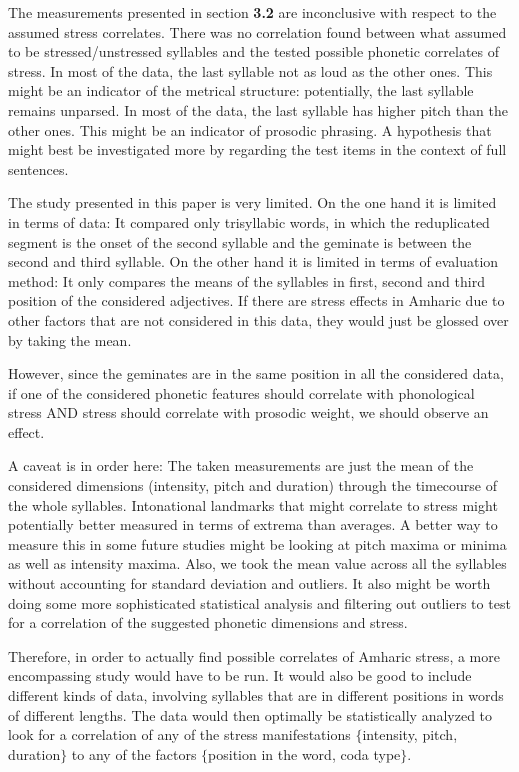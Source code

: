 \documentclass[12pt]{scrartcl}
\begin{document}
The measurements presented in section \textbf{3.2} are inconclusive with respect to the assumed stress correlates. There was no correlation found between what \cite{sande2017} assumed to be stressed/unstressed syllables and the tested possible phonetic correlates of stress. In most of the data, the last syllable not as loud as the other ones. This might be an indicator of the metrical structure: potentially, the last syllable remains unparsed. In most of the data, the last syllable has higher pitch than the other ones. This might be an indicator of prosodic phrasing. A hypothesis that might best be investigated more by regarding the test items in the context of full sentences.

The study presented in this paper is very limited. On the one hand it is limited in terms of data: It compared only trisyllabic words, in which the reduplicated segment is the onset of the second syllable and the geminate is between the second and third syllable. On the other hand it is limited in terms of evaluation method: It only compares the means of the syllables in first, second and third position of the considered adjectives. If there are stress effects in Amharic due to other factors that are not considered in this data, they would just be glossed over by taking the mean.

However, since the geminates are in the same position in all the considered data, if one of the considered phonetic features should correlate with phonological stress AND stress should correlate with prosodic weight, we should observe an effect.

A caveat is in order here: The taken measurements are just the mean of the considered dimensions (intensity, pitch and duration) through the timecourse of the whole syllables. Intonational landmarks that might correlate to stress might potentially better measured in terms of extrema than averages. A better way to measure this in some future studies might be looking at pitch maxima or minima as well as intensity maxima. Also, we took the mean value across all the syllables without accounting for standard deviation and outliers. It also might be worth doing some more sophisticated statistical analysis and filtering out outliers to test for a correlation of the suggested phonetic dimensions and stress.

Therefore, in order to actually find possible correlates of Amharic stress, a more encompassing study would have to be run. It would also be good to include different kinds of data, involving syllables that are in different positions in words of different lengths. The data would then optimally be statistically analyzed to look for a correlation of any of the stress manifestations $\{$intensity, pitch, duration$\}$ to any of the factors $\{$position in the word, coda type$\}$.
\end{document}
